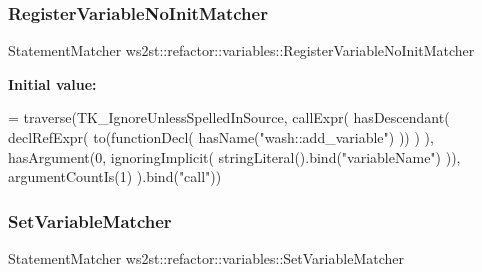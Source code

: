 \subsubsection{\texorpdfstring{Register\+Variable\+No\+Init\+Matcher}{RegisterVariableNoInitMatcher}}
{\footnotesize\ttfamily Statement\+Matcher ws2st\+::refactor\+::variables\+::\+Register\+Variable\+No\+Init\+Matcher}

{\bfseries Initial value\+:}
\begin{DoxyCode}
= traverse(TK\_IgnoreUnlessSpelledInSource, callExpr(
        hasDescendant(
            declRefExpr(
                to(functionDecl(
                    hasName(\textcolor{stringliteral}{"wash::add\_variable"})
                ))
            )
        ),
        hasArgument(0, ignoringImplicit( stringLiteral().bind(\textcolor{stringliteral}{"variableName"}) )),
        argumentCountIs(1)
    ).bind(\textcolor{stringliteral}{"call"}))
\end{DoxyCode}
\mbox{\label{namespacews2st_1_1refactor_1_1variables_a954310f0d468e2af710cdee89425736a}} 
\subsubsection{\texorpdfstring{Set\+Variable\+Matcher}{SetVariableMatcher}}
{\footnotesize\ttfamily Statement\+Matcher ws2st\+::refactor\+::variables\+::\+Set\+Variable\+Matcher}

